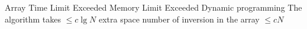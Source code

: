 %
%


 Array 
 Time Limit Exceeded
 Memory Limit Exceeded
 Dynamic programming 
 The algorithm takes $\leq c \lg N$ extra space
 number of inversion in the array $\leq cN$
